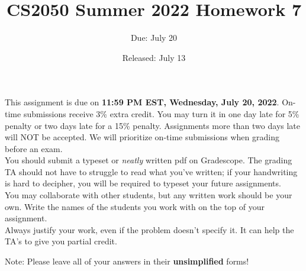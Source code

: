 \documentclass{article}
\title{CS2050 Summer 2022 Homework 7}
\author{Due: July 20}
\date{Released: July 13}
\begin{document}
\maketitle

This assignment is due on \textbf{11:59 PM EST, Wednesday, July 20, 2022}.  On-time submissions receive 3\% extra credit. You may turn it in one day late for 5\% penalty or two days late for a 15\% penalty. Assignments more than two days late will NOT be accepted.  We will prioritize on-time submissions when grading before an exam. \\ 

You should submit a typeset or \emph{neatly} written pdf on Gradescope.  The grading TA should not have to struggle to read what you've written; if your handwriting is hard to decipher, you will be required to typeset your future assignments.\\ 

You may collaborate with other students, but any written work should be your own. Write the names of the students you work with on the top of your assignment.\\

Always justify your work, even if the problem doesn't specify it. It can help the TA's to give you partial credit.



\clearpage

Note: Please leave all of your answers in their \textbf{unsimplified} forms!
\end{document}
